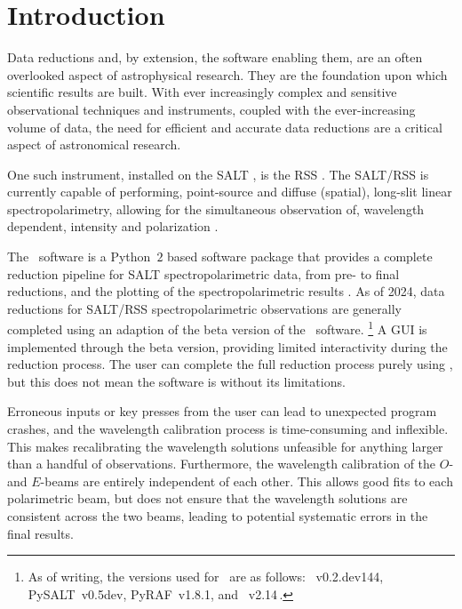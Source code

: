 \chapter{Introduction} \label{ch:01}

Data reductions and, by extension, the software enabling them, are an often overlooked aspect of astrophysical research.
They are the foundation upon which scientific results are built.
With ever increasingly complex and sensitive observational techniques and instruments, coupled with the ever-increasing volume of data, the need for efficient and accurate data reductions are a critical aspect of astronomical research.

One such instrument, installed on the \gls{SALT} \citep{SALT_design}, is the \gls{RSS} \citep{SALT_optical_design}.
The \gls{SALT}/\gls{RSS} is currently capable of performing, point-source and diffuse (spatial), long-slit linear spectropolarimetry, allowing for the simultaneous observation of, wavelength dependent, intensity and polarization \citep{SALT_hires}.

The \polsalt\ software is a Python~$2$ based software package that provides a complete reduction pipeline for \gls{SALT} spectro\-polarimetric data, from pre- to final reductions, and the plotting of the spectro\-polarimetric results \citep{polsalt}.
As of 2024, data reductions for \gls{SALT}/\gls{RSS} spectropolarimetric observations are generally completed using an adaption of the beta version of the \polsalt\ software.%
\footnote{As of writing, the versions used for \polsalt\ are as follows: \polsalt~v0.2.dev144, PySALT~v0.5dev, PyRAF~v1.8.1, and ~v2.14\,.}
A \gls{GUI} is implemented through the beta version, providing limited interactivity during the reduction process.
The user can complete the full reduction process purely using \polsalt, but this does not mean the software is without its limitations.

Erroneous inputs or key presses from the user can lead to unexpected program crashes, and the wavelength calibration process is time-consuming and inflexible.
This makes recalibrating the wavelength solutions unfeasible for anything larger than a handful of observations.
Furthermore, the wavelength calibration of the $O$- and $E$-beams are entirely independent of each other.
This allows good fits to each polarimetric beam, but does not ensure that the wavelength solutions are consistent across the two beams, leading to potential systematic errors in the final results.

